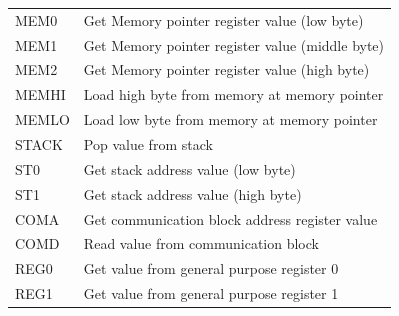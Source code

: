 \begin{longtable}[h!]{| l | p{} |}
	MEM0 & Get Memory pointer register value (low byte) \\
	MEM1 & Get Memory pointer register value (middle byte) \\
	MEM2 & Get Memory pointer register value (high byte) \\
	MEMHI& Load high byte from memory at memory pointer \\
	MEMLO& Load low byte from memory at memory pointer \\\hline
	
	STACK& Pop value from stack \\
	ST0  & Get stack address value (low byte) \\
	ST1  & Get stack address value (high byte) \\
	
	COMA & Get communication block address register value \\
	COMD & Read value from communication block \\\hline
	
	REG0 & Get value from general purpose register 0 \\
	REG1 & Get value from general purpose register 1 \\
	
\end{longtable}	
\pagebreak
